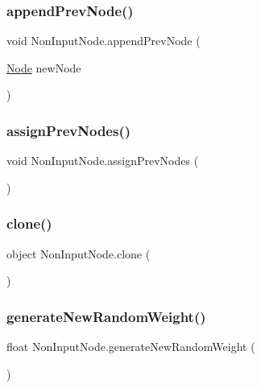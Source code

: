 \subsubsection{\texorpdfstring{append\+Prev\+Node()}{appendPrevNode()}}
{\footnotesize\ttfamily void Non\+Input\+Node.\+append\+Prev\+Node (\begin{DoxyParamCaption}\item[{\mbox{\hyperlink{class_node}{Node}}}]{new\+Node }\end{DoxyParamCaption})}

\mbox{\label{class_non_input_node_abd2e854cfd7c52bc91bd8a14df972a79}} 
\subsubsection{\texorpdfstring{assign\+Prev\+Nodes()}{assignPrevNodes()}}
{\footnotesize\ttfamily void Non\+Input\+Node.\+assign\+Prev\+Nodes (\begin{DoxyParamCaption}{ }\end{DoxyParamCaption})}

\mbox{\label{class_non_input_node_a4aadcefa9b95598c8d8c985e0e690041}} 
\subsubsection{\texorpdfstring{clone()}{clone()}}
{\footnotesize\ttfamily object Non\+Input\+Node.\+clone (\begin{DoxyParamCaption}{ }\end{DoxyParamCaption})}

\mbox{\label{class_non_input_node_a8368526477286eba442737fa000fef16}} 
\subsubsection{\texorpdfstring{generate\+New\+Random\+Weight()}{generateNewRandomWeight()}}
{\footnotesize\ttfamily float Non\+Input\+Node.\+generate\+New\+Random\+Weight (\begin{DoxyParamCaption}{ }\end{DoxyParamCaption})}

